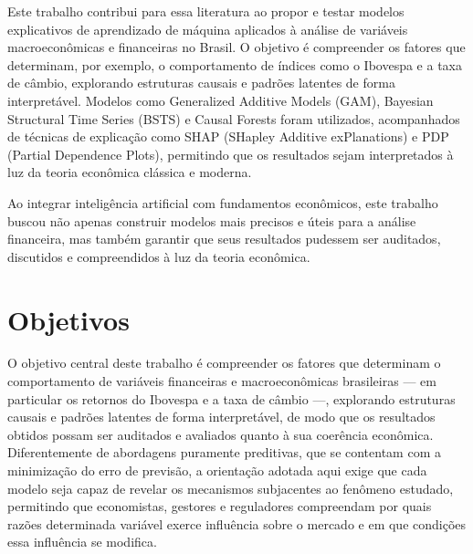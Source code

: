 \documentclass[	12pt, Times, openright, oneside, a4paper, english, brazil]{abntex2}
\begin{document}
Este trabalho contribui para essa literatura ao propor e testar modelos explicativos de aprendizado de máquina aplicados à análise de variáveis macroeconômicas e financeiras no Brasil. O objetivo é compreender os fatores que determinam, por exemplo, o comportamento de índices como o Ibovespa e a taxa de câmbio, explorando estruturas causais e padrões latentes de forma interpretável. Modelos como Generalized Additive Models (GAM), Bayesian Structural Time Series (BSTS) e Causal Forests foram utilizados, acompanhados de técnicas de explicação como SHAP (SHapley Additive exPlanations) e PDP (Partial Dependence Plots), permitindo que os resultados sejam interpretados à luz da teoria econômica clássica e moderna.

Ao integrar inteligência artificial com fundamentos econômicos, este trabalho buscou não apenas construir modelos mais precisos e úteis para a análise financeira, mas também garantir que seus resultados pudessem ser auditados, discutidos e compreendidos à luz da teoria econômica.

\section{Objetivos}

O objetivo central deste trabalho é compreender os fatores que determinam o comportamento de variáveis financeiras e macroeconômicas brasileiras — em particular os retornos do Ibovespa e a taxa de câmbio —, explorando estruturas causais e padrões latentes de forma interpretável, de modo que os resultados obtidos possam ser auditados e avaliados quanto à sua coerência econômica. Diferentemente de abordagens puramente preditivas, que se contentam com a minimização do erro de previsão, a orientação adotada aqui exige que cada modelo seja capaz de revelar os mecanismos subjacentes ao fenômeno estudado, permitindo que economistas, gestores e reguladores compreendam por quais razões determinada variável exerce influência sobre o mercado e em que condições essa influência se modifica.
\end{document}
